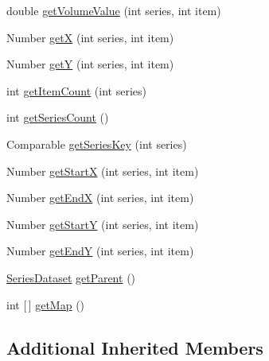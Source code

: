 \begin{DoxyCompactItemize}
\item 
double \mbox{\hyperlink{classorg_1_1jfree_1_1data_1_1general_1_1_sub_series_dataset_ae13206ea086cd80ef9b9a4cb11c8b174}{get\+Volume\+Value}} (int series, int item)
\item 
Number \mbox{\hyperlink{classorg_1_1jfree_1_1data_1_1general_1_1_sub_series_dataset_a5cd509f1412767a8630a4f0440508b64}{getX}} (int series, int item)
\item 
Number \mbox{\hyperlink{classorg_1_1jfree_1_1data_1_1general_1_1_sub_series_dataset_a64188cebb42182d6637bf4c39d3075eb}{getY}} (int series, int item)
\item 
int \mbox{\hyperlink{classorg_1_1jfree_1_1data_1_1general_1_1_sub_series_dataset_ab13353a0418d82e3755c0cc7bef1cfcf}{get\+Item\+Count}} (int series)
\item 
int \mbox{\hyperlink{classorg_1_1jfree_1_1data_1_1general_1_1_sub_series_dataset_a538de339ae10fe14821324e06f441368}{get\+Series\+Count}} ()
\item 
Comparable \mbox{\hyperlink{classorg_1_1jfree_1_1data_1_1general_1_1_sub_series_dataset_a5eec016075fbcf13d31d781448759f75}{get\+Series\+Key}} (int series)
\item 
Number \mbox{\hyperlink{classorg_1_1jfree_1_1data_1_1general_1_1_sub_series_dataset_a81fe209cb69474ae0af304d45aeec686}{get\+StartX}} (int series, int item)
\item 
Number \mbox{\hyperlink{classorg_1_1jfree_1_1data_1_1general_1_1_sub_series_dataset_a31357199c9b8e9bf07d4559ca9003d84}{get\+EndX}} (int series, int item)
\item 
Number \mbox{\hyperlink{classorg_1_1jfree_1_1data_1_1general_1_1_sub_series_dataset_a052aebbd647cedf1958cbac4b198eb7a}{get\+StartY}} (int series, int item)
\item 
Number \mbox{\hyperlink{classorg_1_1jfree_1_1data_1_1general_1_1_sub_series_dataset_a616e968d5eacad03afd3871044c5022e}{get\+EndY}} (int series, int item)
\item 
\mbox{\hyperlink{interfaceorg_1_1jfree_1_1data_1_1general_1_1_series_dataset}{Series\+Dataset}} \mbox{\hyperlink{classorg_1_1jfree_1_1data_1_1general_1_1_sub_series_dataset_a0817fc414a8e775feff83818ce9a6740}{get\+Parent}} ()
\item 
int \mbox{[}$\,$\mbox{]} \mbox{\hyperlink{classorg_1_1jfree_1_1data_1_1general_1_1_sub_series_dataset_a20540010e04859741397e673b45e2efb}{get\+Map}} ()
\end{DoxyCompactItemize}
\subsection*{Additional Inherited Members}



